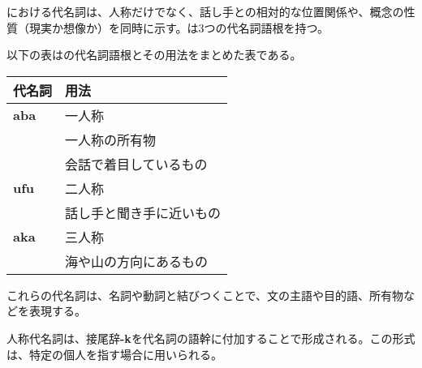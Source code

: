 





\langname における代名詞は、人称だけでなく、話し手との相対的な位置関係や、概念の性質（現実か想像か）を同時に示す。\langname は3つの代名詞語根を持つ。

以下の表は\langname の代名詞語根とその用法をまとめた表である。

\begin{tabular}{ll}
\toprule
代名詞 & 用法 \\
\midrule
\textbf{aba} & 一人称\\
& 一人称の所有物\\
& 会話で着目しているもの \\
\addlinespace[1ex]
\textbf{ufu} & 二人称\\
& 話し手と聞き手に近いもの \\
\addlinespace[1ex]
\textbf{aka} & 三人称\\
& 海や山の方向にあるもの \\
\bottomrule
\end{tabular}

これらの代名詞は、名詞や動詞と結びつくことで、文の主語や目的語、所有物などを表現する。


人称代名詞は、接尾辞\textbf{-k}を代名詞の語幹に付加することで形成される。この形式は、特定の個人を指す場合に用いられる。

